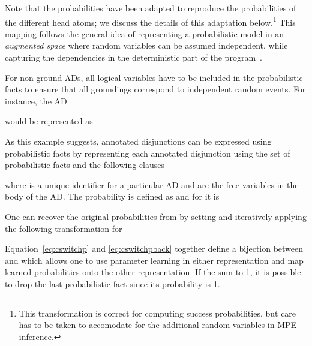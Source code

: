 \documentclass[a4paper]{article}
\begin{document}
Note that the probabilities have been adapted to reproduce the
probabilities of the different head atoms; we discuss the details of
this adaptation below.\footnote{This
  transformation is correct for computing success probabilities, but
  care has to be taken to accomodate for the additional random variables in
  MPE inference.}
This mapping follows the general idea of representing a probabilistic
model in an \emph{augmented space} where random variables can be
assumed independent, while capturing the dependencies in the
deterministic part of the program~\citep{Poole10}.

For non-ground ADs, all logical variables have to be included in the
probabilistic facts to ensure that all groundings correspond to
independent random events. For instance, the AD

would be represented as 




As this example suggests,
annotated disjunctions can be expressed using probabilistic facts by representing each annotated disjunction using the set of probabilistic facts  and  the following clauses 

where  is a unique identifier  for a particular AD and  are the free variables in the body of the AD. The probability  is defined as  and for  it is

One can recover the original probabilities from  by setting  and iteratively applying the following transformation for 

Equation~\eqref{eq:cswitchp} and \eqref{eq:cswitchpback} together define a bijection between  and  which allows one to use parameter learning in either representation and map learned probabilities onto the other representation. If the  sum to 1, it is possible to drop the last probabilistic fact  since its probability  is 1. 
\end{document}
